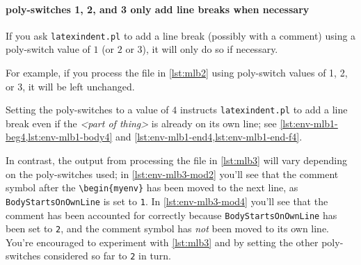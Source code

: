  \paragraph{poly-switches 1, 2, and 3 only add line breaks when necessary}
  If you ask \texttt{latexindent.pl} to add a line break (possibly with a comment) using
  a poly-switch value of $1$ (or $2$ or $3$), it will only do so if necessary.

  \begin{example}
  For example, if you process the file in \vref{lst:mlb2} using poly-switch values of 1,
  2, or 3, it will be left unchanged.

  \begin{cmhtcbraster}
  \end{cmhtcbraster}
  \end{example}

  Setting the poly-switches to a value of $4$ instructs \texttt{latexindent.pl} to add a
  line break even if the \emph{<part of thing>} is already on its own line; see
  \cref{lst:env-mlb1-beg4,lst:env-mlb1-body4} and
  \cref{lst:env-mlb1-end4,lst:env-mlb1-end-f4}.

  \begin{example}
  In contrast, the output from processing the file in \cref{lst:mlb3} will vary depending
  on the poly-switches used; in \cref{lst:env-mlb3-mod2} you'll see that the comment
  symbol after the \lstinline!\begin{myenv}! has been moved to the next line, as
  \texttt{BodyStartsOnOwnLine} is set to \texttt{1}. In \cref{lst:env-mlb3-mod4} you'll
  see that the comment has been accounted for correctly because
  \texttt{BodyStartsOnOwnLine} has been set to \texttt{2}, and the comment symbol has
  \emph{not} been moved to its own line. You're encouraged to experiment with
  \cref{lst:mlb3} and by setting the other poly-switches considered so far to \texttt{2}
  in turn.

  \begin{cmhtcbraster}[raster column skip=.1\linewidth]
  \end{cmhtcbraster}
  \end{example}

